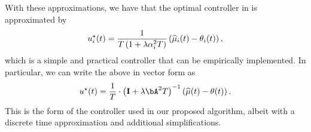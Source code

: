 With these approximations, we have that the optimal controller in  is approximated by
\begin{align}
    u^{\star}_i(t) = \frac{1}{T \left(1 + \lambda \alpha_i^2 T\right)} \left( \widehat{\mu}_i(t) - \theta_i(t) \right),
\end{align}
which is a simple and practical controller that can be empirically implemented.  In particular, we can write the above in vector form as
\begin{align}\label{eq:approx_optimal_control_unknown_mustar}
    \ustar(t) = \frac{1}{T} \cdot \left( \eye + \lambda \bA^2 T \right)^{-1} \left(\muhat(t) - \theta(t) \right).
\end{align}
This is the form of the controller used in our proposed algorithm, albeit with a discrete time approximation and additional simplifications.

